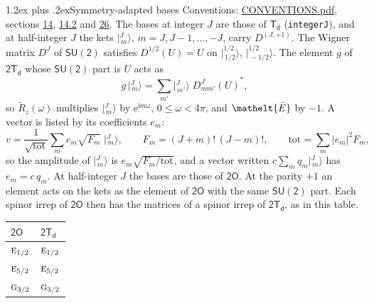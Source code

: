 \documentclass[10pt,a4paper]{article}
\makeatletter
\renewcommand\section{\@startsection{section}{1}{\z@}{-3ex plus -1ex minus -.2ex}%
  {1.2ex plus .2ex}{\normalfont\large\sffamily\bfseries\color{parttitle}}}
\numberwithin{equation}{section}
\newcommand{\eltfont}[1]{{\let\sigma\eltsigma\mathelt{#1}}}
\newcommand{\grp}[1]{\mathsf{#1}}
\newcommand{\irr}[1]{\text{\normalfont\scshape #1}}
\newcommand{\elt}[1]{\eltfont{#1}}
\newcommand{\iunit}{\mathrm{i}}
\newcommand{\expe}{\mathrm{e}}
\newcommand{\irrJp}[2]{D^{(#1,#2)}}
\newcommand{\wignerD}[1]{D^{#1}}
\newcommand{\conj}[1]{{#1}^{*}}
\newcommand{\jm}[2]{\bigl\lvert{}^{#1}_{\,#2}\bigr\rangle}
\newcommand{\barred}[1]{\bar{#1}}
\newcommand{\lift}[1]{\tilde{#1}}
\makeatother
\begin{document}
\section{Symmetry-adapted bases}\label{s:bases}
Conventions: \href{../../CONVENTIONS.pdf}{CONVENTIONS.pdf}, sections \href{../../../rotation/CONVENTIONS.pdf\#conv.14}{14}, \href{../../../rotation/CONVENTIONS.pdf\#conv.14.2}{14.2} and \href{../../CONVENTIONS.pdf\#conv.26}{26}.
\leavevmode\label{n:index.m}\label{n:vector.ket}The bases at integer $J$ are those of \href{../../../rotation/data/pdf/Td.pdf}{$\grp{T_{d}}$} (\texttt{integerJ}), and at half-integer $J$ the kets $\jm{J}{m}$, $m = J, J-1, \dots, -J$, carry $\irrJp{J}{+1}$. \label{n:matrix.wigner}The Wigner matrix $\wignerD{J}$ of $\grp{SU(2)}$ satisfies $\wignerD{1/2}(U) = U$ on $\jm{1/2}{1/2}$, $\jm{1/2}{-1/2}$. The element $g$ of $\grp{2T_{d}}$ whose $\grp{SU(2)}$ part is $U$ acts as
\begin{equation}\label{e:action}g\,\jm{J}{m} = \sum_{m'} \jm{J}{m'}\; \conj{\wignerD{J}_{m m'}(U)},\end{equation}
so $\lift{R}_{z}(\omega)$ multiplies $\jm{J}{m}$ by $\expe^{\iunit m\omega}$, $0 \le \omega < 4\pi$, and $\elt{\barred{E}}$ by $-1$. \label{n:index.ketcoefficient}\label{n:vector.basis.symmetry}\label{n:index.ketweight}\label{n:index.total}A vector is listed by its coefficients $e_m$:
\begin{equation}\label{e:ket}v = \frac{1}{\sqrt{\mathrm{tot}}}\sum_m e_m\sqrt{F_m}\;\jm{J}{m},\qquad F_m = (J+m)!\,(J-m)!,\qquad \mathrm{tot} = \sum_m |e_m|^2F_m,\end{equation}
\leavevmode\label{n:index.factor.c}so the amplitude of $\jm{J}{m}$ is $e_m\sqrt{F_m/\mathrm{tot}}$, and a vector written $c\sum_m q_m\jm{J}{m}$ has $e_m = c\,q_m$.
At half-integer $J$ the bases are those of $\grp{2O}$. At the parity $+1$ an element acts on the kets as the element of $\grp{2O}$ with the same $\grp{SU(2)}$ part. Each spinor irrep of $\grp{2O}$ then has the matrices of a spinor irrep of $\grp{2T_{d}}$, as in this table.
\begin{center}\begin{tabular}{@{}ll@{}}\toprule
$\grp{2O}$ & $\grp{2T_{d}}$\\\midrule
$\irr{e}_{1/2}$ & $\irr{e}_{1/2}$\\
$\irr{e}_{5/2}$ & $\irr{e}_{5/2}$\\
$\irr{g}_{3/2}$ & $\irr{g}_{3/2}$\\
\bottomrule\end{tabular}\end{center}
\end{document}
